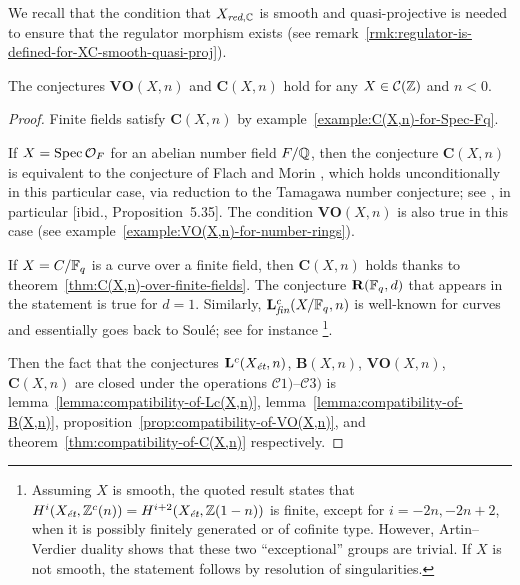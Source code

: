 \documentclass{article}
\numberwithin{equation}{section}
\begin{document}
We recall that the condition that $X_{\red,\CC}$ is smooth and quasi-projective
is needed to ensure that the regulator morphism exists
(see remark~\ref{rmk:regulator-is-defined-for-XC-smooth-quasi-proj}).

\begin{proposition}
  \label{prop:C(X,n)-holds-for-C(Z)}
  The conjectures $\mathbf{VO} (X,n)$ and $\mathbf{C} (X,n)$ hold for any
  $X \in \mathcal{C} (\ZZ)$ and $n < 0$.

  \begin{proof}
    Finite fields satisfy $\mathbf{C} (X,n)$ by
    example~\ref{example:C(X,n)-for-Spec-Fq}.

    If $X = \Spec \mathcal{O}_F$ for an abelian number field $F/\QQ$, then the
    conjecture $\mathbf{C} (X,n)$ is equivalent to the conjecture of Flach and
    Morin \cite[Conjecture 5.11]{Flach-Morin-2018}, which holds unconditionally
    in this particular case, via reduction to the Tamagawa number conjecture;
    see \cite[\S 5.8.3]{Flach-Morin-2018}, in particular
    [ibid., Proposition~5.35]. The condition $\mathbf{VO} (X,n)$ is also true in
    this case (see example~\ref{example:VO(X,n)-for-number-rings}).

    If $X = C/\FF_q$ is a curve over a finite field, then $\mathbf{C} (X,n)$
    holds thanks to theorem~\ref{thm:C(X,n)-over-finite-fields}. The conjecture
    $\mathbf{R} (\FF_q,d)$ that appears in the statement is true for
    $d = 1$. Similarly, $\mathbf{L}_\fin^c (X/\FF_q,n)$ is well-known for curves
    and essentially goes back to Soulé; see for instance
    \cite[Proposition~4.3]{Geisser-2017}\footnote{Assuming $X$ is smooth,
      the quoted result states that
      $H^i (X_\et, \ZZ^c (n)) = H^{i+2} (X_\et, \ZZ (1-n))$ is finite, except
      for $i = -2n, -2n + 2$, when it is possibly finitely generated or of
      cofinite type. However, Artin--Verdier duality
      \cite[Theorem~I]{Beshenov-Weil-etale-1} shows that these two
      ``exceptional'' groups are trivial. If $X$ is not
      smooth, the statement follows by resolution of singularities.}.

    Then the fact that the conjectures $\mathbf{L}^c (X_\et,n)$,
    $\mathbf{B} (X,n)$, $\mathbf{VO} (X,n)$, $\mathbf{C} (X,n)$ are closed under
    the operations $\mathcal{C}1)$--$\mathcal{C}3)$ is
    lemma~\ref{lemma:compatibility-of-Lc(X,n)},
    lemma~\ref{lemma:compatibility-of-B(X,n)},
    proposition~\ref{prop:compatibility-of-VO(X,n)},
    and theorem~\ref{thm:compatibility-of-C(X,n)}
    respectively.
  \end{proof}
\end{proposition}
\end{document}
